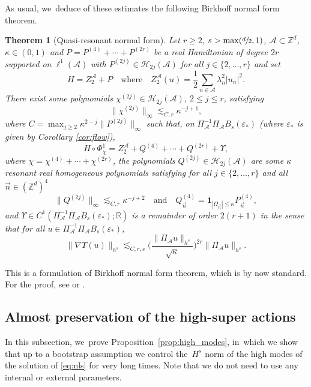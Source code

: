 \documentclass[10pt]{amsart}
\theoremstyle{plain}
\newtheorem{theorem}{Theorem}[section]
\theoremstyle{definition}
\newcommand{\1}{\mathbf{1}}
\begin{document}
As usual, we~deduce of these estimates the following Birkhoff normal form theorem.
\begin{theorem}[Quasi-resonant normal form]
\label{thm:res-nf} Let $r\geq2$, $s> \max(\sfrac{d}{2},1)$, $\mathcal{A} \subset \mathbb{Z}^d$, $\kappa \in (0,1)$ and $P = P^{(4)} + \cdots + P^{(2r)}$ be a real Hamiltonian of degree $2r$ supported on $\ell^1(\mathcal{A})$ with $P^{(2j)} \in \mathcal{H}_{2j}(\mathcal{A})$ for all $j\in \{ 2,\dots,r \}$ and set
\[
H = Z_2^{\mathcal{A}} + P \quad \mathrm{where } \quad Z_2^{\mathcal{A}}(u) = \frac12\sum_{n\in \mathcal{A}} \lambda_n^2 |u_n|^2.
\]
There exist some polynomials $\chi^{(2j)} \in \mathcal{H}_{2j}(\mathcal{A})$, $2\leq j \leq r$, satisfying
\[
\| \chi^{(2j)} \|_{\infty} \lesssim_{ C,r} \kappa^{-j+1},
\]
where $C = \max_{j\geq 2} \kappa^{2-j}\| P^{(2j)} \|_{\infty}$ such that, on $\Pi_{\mathcal{A}}^{-1}\Pi_{\mathcal{A}}B_s(\varepsilon_*) $ (where $\varepsilon_*$ is given by Corollary \ref{cor:flow}),
\[
H\circ \Phi_{\chi}^1 = Z_2^{\mathcal{A}} + Q^{(4)} + \cdots+ Q^{(2r)} + \Upsilon,
\]
where $\chi = \chi^{(4)} + \cdots + \chi^{(2r)}$, the polynomials $Q^{(2j)} \in \mathcal{H}_{2j}(\mathcal{A})$ are some $\kappa$ resonant real homogeneous polynomials satisfying for all $j\in \{2,\dots,r\}$ and all $\vec{n} \in (\mathbb{Z}^d)^4$
\[
\| Q^{(2j)} \|_{\infty} \lesssim_{C,r} \kappa^{-j+2} \quad \mathrm{and} \quad Q^{(4)}_{\vec{n}} = \mathbf{1}_{|\Omega_{\vec{n}}| \leq \kappa} P^{(4)}_{\vec{n}},
\]
and $\Upsilon \in C^1(\Pi_{\mathcal{A}}^{-1}\Pi_{\mathcal{A}}B_s(\varepsilon_*);\mathbb{R})$ is a remainder of order $2(r+1)$ in the sense that for all $u\in \Pi_{\mathcal{A}}^{-1}\Pi_{\mathcal{A}}B_s(\varepsilon_*)$,
\begin{equation}
\label{eq:R-res}
\|\nabla \Upsilon(u)\|_{h^{s}}\lesssim_{C,r,s} \Big(\frac{\| \Pi_{\mathcal{A}} u\|_{h^{s}}}{\sqrt{\kappa}} \Big)^{2r}\|\Pi_{\mathcal{A}} u\|_{h^{s}}.
\end{equation}
\end{theorem}
This is a formulation of Birkhoff normal form theorem, which is by now standard. For the proof, see \cite[Th.\,2.15]{BG22} or \cite[Th.\,2.12]{BGR23}.

\subsection{Almost preservation of the high-super actions}
In this subsection, we~prove Proposition~\ref{prop:high_modes}, in~which we show that up to a bootstrap assumption we control the~$H^s$ norm of the high modes of the solution of \eqref{eq:nls} for very long times. Note that we do not need to use any internal or external parameters.
\end{document}
